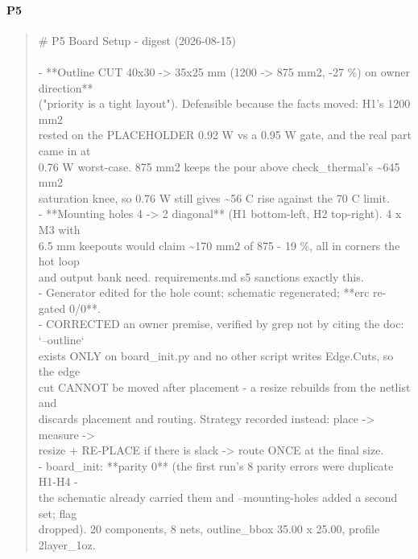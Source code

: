 \documentclass[11pt,a4paper]{article}
\begin{document}
\paragraph*{P5}
\begin{quote}\small\ttfamily\raggedright
\# P5 Board Setup - digest (2026-08-15)\\
~\\
- {*}{*}Outline CUT 40x30 -\textgreater{} 35x25 mm (1200 -\textgreater{} 875 mm2, -27 \%) on owner direction{*}{*}\\
  ("priority is a tight layout"). Defensible because the facts moved: H1's 1200 mm2\\
  rested on the PLACEHOLDER 0.92 W vs a 0.95 W gate, and the real part came in at\\
  0.76 W worst-case. 875 mm2 keeps the pour above check\_thermal's \textasciitilde{}645 mm2\\
  saturation knee, so 0.76 W still gives \textasciitilde{}56 C rise against the 70 C limit.\\
- {*}{*}Mounting holes 4 -\textgreater{} 2 diagonal{*}{*} (H1 bottom-left, H2 top-right). 4 x M3 with\\
  6.5 mm keepouts would claim \textasciitilde{}170 mm2 of 875 - 19 \%, all in corners the hot loop\\
  and output bank need. requirements.md s5 sanctions exactly this.\\
- Generator edited for the hole count; schematic regenerated; {*}{*}erc re-gated 0/0{*}{*}.\\
- CORRECTED an owner premise, verified by grep not by citing the doc: `--outline`\\
  exists ONLY on board\_init.py and no other script writes Edge.Cuts, so the edge\\
  cut CANNOT be moved after placement - a resize rebuilds from the netlist and\\
  discards placement and routing. Strategy recorded instead: place -\textgreater{} measure -\textgreater{}\\
  resize + RE-PLACE if there is slack -\textgreater{} route ONCE at the final size.\\
- board\_init: {*}{*}parity 0{*}{*} (the first run's 8 parity errors were duplicate H1-H4 -\\
  the schematic already carried them and --mounting-holes added a second set; flag\\
  dropped). 20 components, 8 nets, outline\_bbox 35.00 x 25.00, profile 2layer\_1oz.\\

\end{quote}
\end{document}
